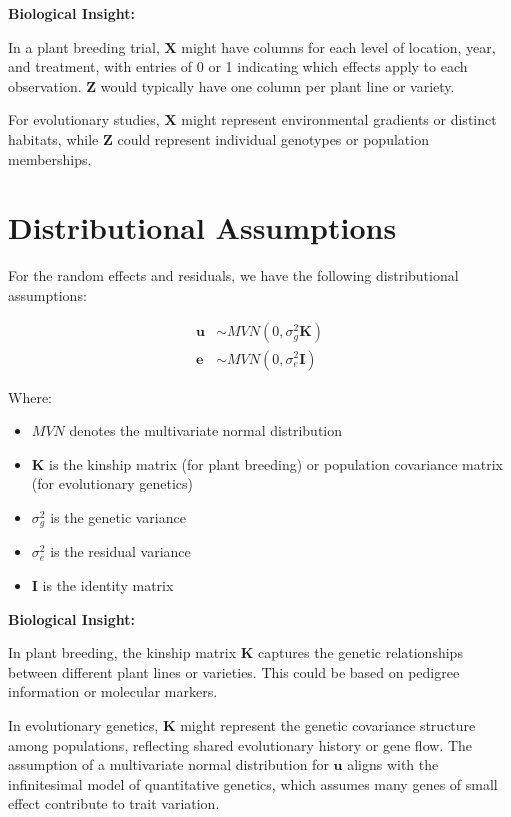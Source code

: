 \documentclass[12pt,a4paper]{article}
\newenvironment{biologicalinsightbox}[1][]
{\begin{basebox}[linecolor=uqpurple]
\textbf{\color{uqpurple}Biological Insight:} \textit{#1}\par\noindent\ignorespaces}
{\end{basebox}}
\begin{document}
\begin{biologicalinsightbox}
    In a plant breeding trial, $\mathbf{X}$ might have columns for each level of location, year, and treatment, with entries of 0 or 1 indicating which effects apply to each observation. $\mathbf{Z}$ would typically have one column per plant line or variety.

For evolutionary studies, $\mathbf{X}$ might represent environmental gradients or distinct habitats, while $\mathbf{Z}$ could represent individual genotypes or population memberships.
\end{biologicalinsightbox}

\section{Distributional Assumptions}

For the random effects and residuals, we have the following distributional assumptions:

\begin{align}
    \mathbf{u} &\sim MVN(0, \sigma^2_g\mathbf{K}) \\
    \mathbf{e} &\sim MVN(0, \sigma^2_e\mathbf{I})
\end{align}

Where:
\begin{itemize}
    \item $MVN$ denotes the multivariate normal distribution
    \item $\mathbf{K}$ is the kinship matrix (for plant breeding) or population covariance matrix (for evolutionary genetics)
    \item $\sigma^2_g$ is the genetic variance
    \item $\sigma^2_e$ is the residual variance
    \item $\mathbf{I}$ is the identity matrix
\end{itemize}

\begin{biologicalinsightbox}

In plant breeding, the kinship matrix $\mathbf{K}$ captures the genetic relationships between different plant lines or varieties. This could be based on pedigree information or molecular markers.

In evolutionary genetics, $\mathbf{K}$ might represent the genetic covariance structure among populations, reflecting shared evolutionary history or gene flow. The assumption of a multivariate normal distribution for $\mathbf{u}$ aligns with the infinitesimal model of quantitative genetics, which assumes many genes of small effect contribute to trait variation.
\end{biologicalinsightbox}
\end{document}
